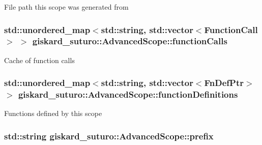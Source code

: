 File path this scope was generated from \hypertarget{classgiskard__suturo_1_1AdvancedScope_a6208063287509649126390c5960abfb8}{
\subsubsection[{function\-Calls}]{\setlength{\rightskip}{0pt plus 5cm}std\-::unordered\-\_\-map$<$std\-::string, std\-::vector$<${\bf Function\-Call}$>$ $>$ giskard\-\_\-suturo\-::\-Advanced\-Scope\-::function\-Calls\hspace{0.3cm}{\ttfamily [private]}}}\label{classgiskard__suturo_1_1AdvancedScope_a6208063287509649126390c5960abfb8}
Cache of function calls \hypertarget{classgiskard__suturo_1_1AdvancedScope_a32385ec7d5bdd31f190473293e3445f8}{
\subsubsection[{function\-Definitions}]{\setlength{\rightskip}{0pt plus 5cm}std\-::unordered\-\_\-map$<$std\-::string, std\-::vector$<$Fn\-Def\-Ptr$>$ $>$ giskard\-\_\-suturo\-::\-Advanced\-Scope\-::function\-Definitions\hspace{0.3cm}{\ttfamily [private]}}}\label{classgiskard__suturo_1_1AdvancedScope_a32385ec7d5bdd31f190473293e3445f8}
Functions defined by this scope \hypertarget{classgiskard__suturo_1_1AdvancedScope_ac69aab3b5b22fc62d1d0f8e213e86ec5}{
\subsubsection[{prefix}]{\setlength{\rightskip}{0pt plus 5cm}std\-::string giskard\-\_\-suturo\-::\-Advanced\-Scope\-::prefix\hspace{0.3cm}{\ttfamily [protected]}}}\label{classgiskard__suturo_1_1AdvancedScope_ac69aab3b5b22fc62d1d0f8e213e86ec5}
